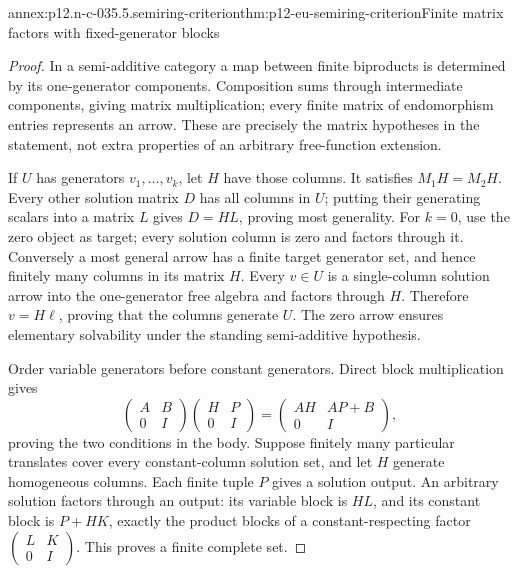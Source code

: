 \begin{annexitem}{annex:p12.n-c-035.5.semiring-criterion}{thm:p12-eu-semiring-criterion}{Finite matrix factors with fixed-generator blocks}
\begin{proof}
In a semi-additive category a map between finite biproducts is
determined by its one-generator components. Composition sums through
intermediate components, giving matrix multiplication; every finite
matrix of endomorphism entries represents an arrow. These are precisely
the matrix hypotheses in the statement, not extra properties of an
arbitrary free-function extension.

If \(U\) has generators \(v_1,\ldots,v_k\), let \(H\) have
those columns. It satisfies \(M_1H=M_2H\). Every other solution
matrix \(D\) has all columns in \(U\); putting their generating
scalars into a matrix \(L\) gives \(D=HL\), proving most
generality. For \(k=0\), use the zero object as target; every
solution column is zero and factors through it. Conversely a most
general arrow has a finite target generator set, and hence finitely
many columns in its matrix \(H\). Every \(v\in U\) is a
single-column solution arrow into the one-generator free algebra and
factors through \(H\). Therefore \(v=H\ell\), proving that
the columns generate \(U\). The zero arrow ensures elementary
solvability under the standing semi-additive hypothesis.

Order variable generators before constant generators. Direct block
multiplication gives
\[
 \begin{pmatrix}A&B\\0&I\end{pmatrix}
 \begin{pmatrix}H&P\\0&I\end{pmatrix}
 =\begin{pmatrix}AH&AP+B\\0&I\end{pmatrix},
\]
proving the two conditions in the body. Suppose finitely many
particular translates cover every constant-column solution set, and
let \(H\) generate homogeneous columns. Each finite tuple \(P\)
gives a solution output. An arbitrary solution factors through an
output: its variable block is \(HL\), and its constant block is
\(P+HK\), exactly the product blocks of a constant-respecting
factor \(\left(\begin{smallmatrix}L&K\\0&I\end{smallmatrix}\right)\).
This proves a finite complete set.


\end{proof}
\end{annexitem}
